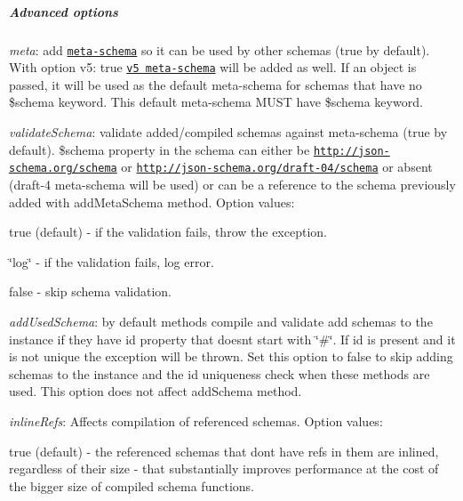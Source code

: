 \subparagraph*{Advanced options}


\begin{DoxyItemize}
\item {\itshape meta}\+: add \href{http://json-schema.org/documentation.html}{\tt meta-\/schema} so it can be used by other schemas (true by default). With option {\ttfamily v5\+: true} \href{https://raw.githubusercontent.com/epoberezkin/ajv/master/lib/refs/json-schema-v5.json#}{\tt v5 meta-\/schema} will be added as well. If an object is passed, it will be used as the default meta-\/schema for schemas that have no {\ttfamily \$schema} keyword. This default meta-\/schema M\+U\+ST have {\ttfamily \$schema} keyword.
\item {\itshape validate\+Schema}\+: validate added/compiled schemas against meta-\/schema (true by default). {\ttfamily \$schema} property in the schema can either be \href{http://json-schema.org/schema}{\tt http\+://json-\/schema.\+org/schema} or \href{http://json-schema.org/draft-04/schema}{\tt http\+://json-\/schema.\+org/draft-\/04/schema} or absent (draft-\/4 meta-\/schema will be used) or can be a reference to the schema previously added with {\ttfamily add\+Meta\+Schema} method. Option values\+:
\begin{DoxyItemize}
\item {\ttfamily true} (default) -\/ if the validation fails, throw the exception.
\item {\ttfamily \char`\"{}log\char`\"{}} -\/ if the validation fails, log error.
\item {\ttfamily false} -\/ skip schema validation.
\end{DoxyItemize}
\item {\itshape add\+Used\+Schema}\+: by default methods {\ttfamily compile} and {\ttfamily validate} add schemas to the instance if they have {\ttfamily id} property that doesn\textquotesingle{}t start with \char`\"{}\#\char`\"{}. If {\ttfamily id} is present and it is not unique the exception will be thrown. Set this option to {\ttfamily false} to skip adding schemas to the instance and the {\ttfamily id} uniqueness check when these methods are used. This option does not affect {\ttfamily add\+Schema} method.
\item {\itshape inline\+Refs}\+: Affects compilation of referenced schemas. Option values\+:
\begin{DoxyItemize}
\item {\ttfamily true} (default) -\/ the referenced schemas that don\textquotesingle{}t have refs in them are inlined, regardless of their size -\/ that substantially improves performance at the cost of the bigger size of compiled schema functions.

\end{DoxyItemize}
\end{DoxyItemize}
